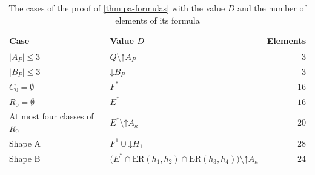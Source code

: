 \documentclass[pdflatex,sn-mathphys-num]{sn-jnl}%
\theoremstyle{thmstyleone}%
\theoremstyle{thmstyletwo}%
\theoremstyle{thmstylethree}%
\newcommand{\dn}{\mathord{\downarrow}}%
\newcommand{\upp}{\mathord{\uparrow}}%
\newcommand{\ER}{\mathrm{ER}}%
\begin{document}
\begin{table}[tb]
\caption{The cases of the proof of \cref{thm:pa-formulas} with the value $D$ and the number of elements of its formula}
\label{tab:pa-exits}
\begin{tabular}{@{}llr@{}}
\toprule
Case & Value $D$ & Elements \\
\midrule
$|A_P| \leq 3$ & $Q \setminus \upp A_P$ & $3$ \\
$|B_P| \leq 3$ & $\dn B_P$ & $3$ \\
$C_0 = \emptyset$ & $F^*$ & $16$ \\
$R_0 = \emptyset$ & $E^*$ & $16$ \\
At most four classes of $R_0$ & $E^* \setminus \upp A_\kappa$ & $20$ \\
Shape A & $F^1 \cup \dn H_1$ & $28$ \\
Shape B & $\bigl(E^* \cap \ER(h_1, h_2) \cap \ER(h_3, h_4)\bigr) \setminus \upp A_\kappa$ & $24$ \\
\botrule
\end{tabular}
\end{table}
\end{document}
